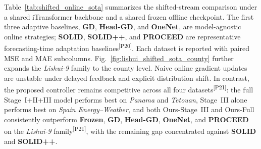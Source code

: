 ﻿\documentclass[journal]{IEEEtran}
\DeclareRobustCommand{\auditbad}[2]{{\color{auditred}#1}{\color{auditred}\textsuperscript{[#2]}}}
\begin{document}
Table~\ref{tab:shifted_online_sota} summarizes the shifted-stream comparison under a shared iTransformer backbone and a shared frozen offline checkpoint. The first three adaptive baselines, \textbf{GD}, \textbf{Head-GD}, and \textbf{OneNet}, are model-agnostic online strategies; \textbf{SOLID}, \textbf{SOLID++}, and \textbf{PROCEED} are \auditbad{representative forecasting-time adaptation baselines}{P20}. Each dataset is reported with paired MSE and MAE subcolumns. Fig.~\ref{fig:lishui_shifted_sota_county} further expands the \textit{Lishui-9} family to the county level. Naive online gradient updates are unstable under delayed feedback and explicit distribution shift. In contrast, the proposed controller remains \auditbad{competitive across all four datasets}{P21}: the full Stage~I+II+III model performs best on \textit{Panama} and \textit{Tetouan}, Stage~III alone performs best on \textit{Spain Energy--Weather}, and both Ours-Stage~III and Ours-Full \auditbad{consistently outperform \textbf{Frozen}, \textbf{GD}, \textbf{Head-GD}, \textbf{OneNet}, and \textbf{PROCEED} on the \textit{Lishui-9} family}{P21}, with the remaining gap concentrated against \textbf{SOLID} and \textbf{SOLID++}.
\end{document}
